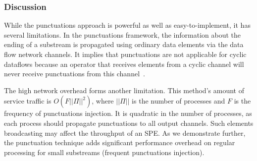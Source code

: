 \subsubsection{Discussion}

While the punctuations approach is powerful as well as easy-to-implement, it has several limitations. In the punctuations framework, the information about the ending of a substream is propagated using ordinary data elements via the data flow network channels. It implies that punctuations are not applicable for cyclic dataflows because an operator that receives elements from a cyclic channel will never receive punctuations from this channel~\cite{carbone2018scalable}.

The high network overhead forms another limitation. This method's amount of service traffic is $O(F||\Pi||^2)$, where $||\Pi||$ is the number of processes and $F$ is the frequency of punctuations injection. It is quadratic in the number of processes, as each process should propagate punctuations to all output channels. Such elements broadcasting may affect the throughput of an SPE. As we demonstrate further, the punctuation technique adds significant performance overhead on regular processing for small substreams (frequent punctuations injection).